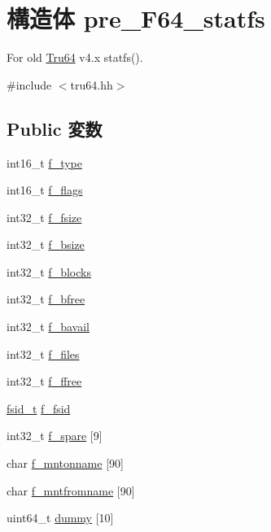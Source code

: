 \hypertarget{structTru64_1_1pre__F64__statfs}{
\section{構造体 pre\_\-F64\_\-statfs}
\label{structTru64_1_1pre__F64__statfs}
}


For old \hyperlink{classTru64}{Tru64} v4.x statfs().  


{\ttfamily \#include $<$tru64.hh$>$}\subsection*{Public 変数}
\begin{DoxyCompactItemize}
\item 
int16\_\-t \hyperlink{structTru64_1_1pre__F64__statfs_aa0722a16ad0079be617958da83f98ce0}{f\_\-type}
\item 
int16\_\-t \hyperlink{structTru64_1_1pre__F64__statfs_a20c775afb53740b13af4894efef44eff}{f\_\-flags}
\item 
int32\_\-t \hyperlink{structTru64_1_1pre__F64__statfs_a1bb154c566b7a49bab772195adc48e11}{f\_\-fsize}
\item 
int32\_\-t \hyperlink{structTru64_1_1pre__F64__statfs_a7f0a1c3c49d5ff66040ffba26026b8db}{f\_\-bsize}
\item 
int32\_\-t \hyperlink{structTru64_1_1pre__F64__statfs_a199ab36dc22b9a68fac077a26543a34e}{f\_\-blocks}
\item 
int32\_\-t \hyperlink{structTru64_1_1pre__F64__statfs_a7b6f2e45cd83f27524dd19aaee0fd355}{f\_\-bfree}
\item 
int32\_\-t \hyperlink{structTru64_1_1pre__F64__statfs_a3569ac2d1a1e4f504790713a14573547}{f\_\-bavail}
\item 
int32\_\-t \hyperlink{structTru64_1_1pre__F64__statfs_afadb20625758ce43538519ca8d903bde}{f\_\-files}
\item 
int32\_\-t \hyperlink{structTru64_1_1pre__F64__statfs_a5278009646ea2743c6219585d2247ded}{f\_\-ffree}
\item 
\hyperlink{structTru64_1_1quad}{fsid\_\-t} \hyperlink{structTru64_1_1pre__F64__statfs_a8a64796a8d470994acfed74f13ee7195}{f\_\-fsid}
\item 
int32\_\-t \hyperlink{structTru64_1_1pre__F64__statfs_a8ade6b3791688e640ffe1f5c4960ff4b}{f\_\-spare} \mbox{[}9\mbox{]}
\item 
char \hyperlink{structTru64_1_1pre__F64__statfs_aa2570f2c18c34fa7c18c8c214eef885c}{f\_\-mntonname} \mbox{[}90\mbox{]}
\item 
char \hyperlink{structTru64_1_1pre__F64__statfs_ae1b514698ddbfb9f725dea8522f6a00c}{f\_\-mntfromname} \mbox{[}90\mbox{]}
\item 
uint64\_\-t \hyperlink{structTru64_1_1pre__F64__statfs_a4cd74d7de5e89a80fa201325cf18b8fd}{dummy} \mbox{[}10\mbox{]}
\end{DoxyCompactItemize}


